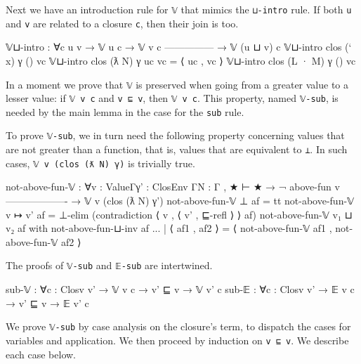 Next we have an introduction rule for \texttt{𝕍} that mimics the
\texttt{⊔-intro} rule. If both \texttt{u} and \texttt{v} are related to
a closure \texttt{c}, then their join is too.

\begin{fence}
\begin{code}
𝕍⊔-intro : ∀{c u v}
         → 𝕍 u c → 𝕍 v c
           ---------------
         → 𝕍 (u ⊔ v) c
𝕍⊔-intro {clos (` x) γ} () vc
𝕍⊔-intro {clos (ƛ N) γ} uc vc = ⟨ uc , vc ⟩
𝕍⊔-intro {clos (L · M) γ} () vc
\end{code}
\end{fence}

In a moment we prove that \texttt{𝕍} is preserved when going from a
greater value to a lesser value: if \texttt{𝕍\ v\ c} and
\texttt{v\textquotesingle{}\ ⊑\ v}, then
\texttt{𝕍\ v\textquotesingle{}\ c}. This property, named \texttt{𝕍-sub},
is needed by the main lemma in the case for the \texttt{sub} rule.

To prove \texttt{𝕍-sub}, we in turn need the following property
concerning values that are not greater than a function, that is, values
that are equivalent to \texttt{⊥}. In such cases,
\texttt{𝕍\ v\ (clos\ (ƛ\ N)\ γ\textquotesingle{})} is trivially true.

\begin{fence}
\begin{code}
not-above-fun-𝕍 : ∀{v : Value}{Γ}{γ' : ClosEnv Γ}{N : Γ , ★ ⊢ ★ }
    → ¬ above-fun v
      -------------------
    → 𝕍 v (clos (ƛ N) γ')
not-above-fun-𝕍 {⊥} af = tt
not-above-fun-𝕍 {v ↦ v'} af = ⊥-elim (contradiction ⟨ v , ⟨ v' , ⊑-refl ⟩ ⟩ af)
not-above-fun-𝕍 {v₁ ⊔ v₂} af
    with not-above-fun-⊔-inv af
... | ⟨ af1 , af2 ⟩ = ⟨ not-above-fun-𝕍 af1 , not-above-fun-𝕍 af2 ⟩
\end{code}
\end{fence}

The proofs of \texttt{𝕍-sub} and \texttt{𝔼-sub} are intertwined.

\begin{fence}
\begin{code}
sub-𝕍 : ∀{c : Clos}{v v'} → 𝕍 v c → v' ⊑ v → 𝕍 v' c
sub-𝔼 : ∀{c : Clos}{v v'} → 𝔼 v c → v' ⊑ v → 𝔼 v' c
\end{code}
\end{fence}

We prove \texttt{𝕍-sub} by case analysis on the closure's term, to
dispatch the cases for variables and application. We then proceed by
induction on \texttt{v\textquotesingle{}\ ⊑\ v}. We describe each case
below.

